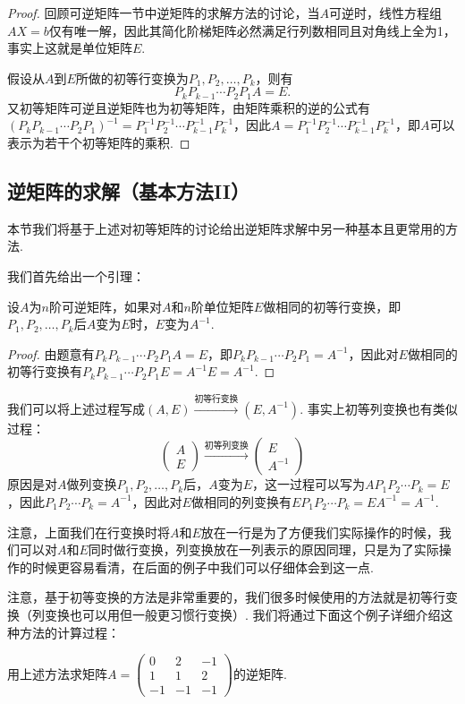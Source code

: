 \begin{proof}
    回顾可逆矩阵一节中逆矩阵的求解方法的讨论，当$A$可逆时，线性方程组$AX=b$仅有唯一解，因此其简化阶梯矩阵必然满足行列数相同且对角线上全为1，事实上这就是单位矩阵$E$.

    假设从$A$到$E$所做的初等行变换为$P_1,P_2,\ldots,P_k$，则有
    \[P_kP_{k-1}\cdots P_2P_1A=E.\]
    又初等矩阵可逆且逆矩阵也为初等矩阵，由矩阵乘积的逆的公式有$(P_kP_{k-1}\cdots P_2P_1)^{-1}=P_1^{-1}P_2^{-1}\cdots P_{k-1}^{-1}P_k^{-1}$，因此$A=P_1^{-1}P_2^{-1}\cdots P_{k-1}^{-1}P_k^{-1}$，即$A$可以表示为若干个初等矩阵的乘积.
\end{proof}

\subsection{逆矩阵的求解（基本方法II）}

本节我们将基于上述对初等矩阵的讨论给出逆矩阵求解中另一种基本且更常用的方法.

我们首先给出一个引理：
\begin{lemma}
    设$A$为$n$阶可逆矩阵，如果对$A$和$n$阶单位矩阵$E$做相同的初等行变换，即$P_1,P_2,\ldots,P_k$后$A$变为$E$时，$E$变为$A^{-1}$.
\end{lemma}

\begin{proof}
    由题意有$P_kP_{k-1}\cdots P_2P_1A=E$，即$P_kP_{k-1}\cdots P_2P_1=A^{-1}$，因此对$E$做相同的初等行变换有$P_kP_{k-1}\cdots P_2P_1E=A^{-1}E=A^{-1}$.
\end{proof}

我们可以将上述过程写成$(A,E)\xrightarrow{\text{初等行变换}}(E,A^{-1})$. 事实上初等列变换也有类似过程：
\[\begin{pmatrix}
        A \\ E
    \end{pmatrix}\xrightarrow{\text{初等列变换}}\begin{pmatrix}
        E \\ A^{-1}
    \end{pmatrix}\]
原因是对$A$做列变换$P_1,P_2,\ldots,P_k$后，$A$变为$E$，这一过程可以写为$AP_1P_2\cdots P_k=E$，因此$P_1P_2\cdots P_k=A^{-1}$，因此对$E$做相同的列变换有$EP_1P_2\cdots P_k=EA^{-1}=A^{-1}$.

注意，上面我们在行变换时将$A$和$E$放在一行是为了方便我们实际操作的时候，我们可以对$A$和$E$同时做行变换，列变换放在一列表示的原因同理，只是为了实际操作的时候更容易看清，在后面的例子中我们可以仔细体会到这一点.

注意，基于初等变换的方法是非常重要的，我们很多时候使用的方法就是初等行变换（列变换也可以用但一般更习惯行变换）. 我们将通过下面这个例子详细介绍这种方法的计算过程：
\begin{example}
    用上述方法求矩阵$A=\begin{pmatrix}0 & 2 & -1 \\ 1 & 1 & 2 \\ -1 & -1 & -1\end{pmatrix}$的逆矩阵.
\end{example}

